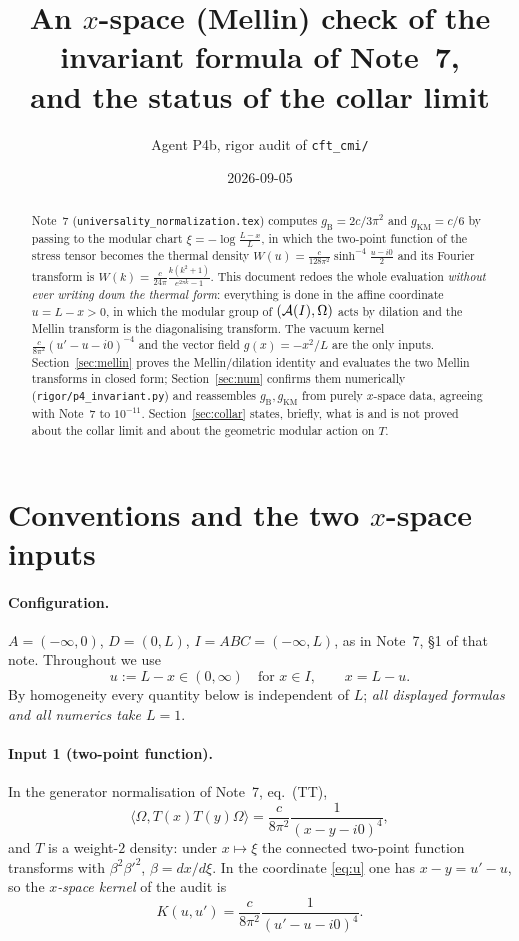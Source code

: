 \documentclass[11pt]{article}
\title{An $x$-space (Mellin) check of the invariant formula of Note~7,\\
and the status of the collar limit}
\author{Agent P4b, rigor audit of \texttt{cft\_cmi/}}
\date{2026-09-05}
\newcommand{\Wh}{\widehat W}
\newcommand{\Om}{\Omega}
\newcommand{\gB}{g_{\mathrm B}}
\newcommand{\gKM}{g_{\mathrm{KM}}}
\begin{document}
\maketitle

\begin{abstract}
Note~7 (\texttt{universality\_normalization.tex}) computes $\gB=2c/3\pi^2$ and $\gKM=c/6$ by
passing to the modular chart $\xi=-\log\frac{L-x}{L}$, in which the two-point function of the
stress tensor becomes the thermal density $W(u)=\frac{c}{128\pi^2}\sinh^{-4}\frac{u-i0}2$ and its
Fourier transform is $\Wh(k)=\frac{c}{24\pi}\frac{k(k^2+1)}{e^{2\pi k}-1}$.  This document redoes the
whole evaluation \emph{without ever writing down the thermal form}: everything is done in the affine
coordinate $u=L-x>0$, in which the modular group of $(\cA(I),\Om)$ acts by dilation and the Mellin
transform is the diagonalising transform.  The vacuum kernel $\frac{c}{8\pi^2}(u'-u-i0)^{-4}$
and the vector field $g(x)=-x^2/L$ are the only inputs.  Section~\ref{sec:mellin} proves the
Mellin/dilation identity and evaluates the two Mellin transforms in closed form;
Section~\ref{sec:num} confirms them numerically (\texttt{rigor/p4\_invariant.py}) and reassembles
$\gB,\gKM$ from purely $x$-space data, agreeing with Note~7 to $10^{-11}$.
Section~\ref{sec:collar} states, briefly, what is and is not proved about the collar limit and about
the geometric modular action on $T$.
\end{abstract}

\section{Conventions and the two $x$-space inputs}\label{sec:conv}

\paragraph{Configuration.} $A=(-\infty,0)$, $D=(0,L)$, $I=ABC=(-\infty,L)$, as in Note~7,
\S1 of that note.  Throughout we use
\begin{equation}\label{eq:u}
 u:=L-x\in(0,\infty)\quad\text{for }x\in I,\qquad x=L-u .
\end{equation}
By homogeneity every quantity below is independent of $L$; \emph{all displayed formulas and all
numerics take $L=1$}.

\paragraph{Input 1 (two-point function).} In the generator normalisation of Note~7, eq.~(TT),
\begin{equation}\label{eq:TT}
 \langle\Om,T(x)T(y)\Om\rangle=\frac{c}{8\pi^2}\frac1{(x-y-i0)^4},
\end{equation}
and $T$ is a weight-$2$ density: under $x\mapsto\xi$ the connected two-point function transforms with
$\beta^2\beta'^2$, $\beta=dx/d\xi$.  In the coordinate \eqref{eq:u} one has $x-y=u'-u$, so the
\emph{$x$-space kernel} of the audit is
\begin{equation}\label{eq:Kxu}
 K(u,u')=\frac{c}{8\pi^2}\frac1{(u'-u-i0)^4}.
\end{equation}
\end{document}
